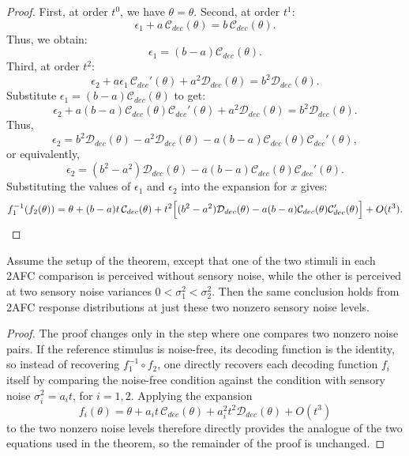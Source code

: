 \documentclass[si.tex]{subfiles}
\begin{document}
\begin{proof}
First, at order \( t^0 \), we have $\theta=\theta$.
Second, at order \( t^1 \):
\[
\epsilon_1 + a\,\mathcal{C}_{dec}(\theta) = b\,\mathcal{C}_{dec}(\theta).
\]
Thus, we obtain:
\[
\epsilon_1 = (b - a)\mathcal{C}_{dec}(\theta).
\]
Third, at order \( t^2 \):
\[
\epsilon_2 + a\epsilon_1\,\mathcal{C}_{dec}'(\theta) + a^2\mathcal{D}_{dec}(\theta) = b^2\mathcal{D}_{dec}(\theta).
\]
Substitute \(\epsilon_1 = (b-a)\mathcal{C}_{dec}(\theta)\) to get:
\[
\epsilon_2 + a(b-a)\mathcal{C}_{dec}(\theta)\mathcal{C}_{dec}'(\theta) + a^2\mathcal{D}_{dec}(\theta) = b^2\mathcal{D}_{dec}(\theta).
\]
Thus,
\[
\epsilon_2 = b^2\mathcal{D}_{dec}(\theta) - a^2\mathcal{D}_{dec}(\theta) - a(b-a)\mathcal{C}_{dec}(\theta)\mathcal{C}_{dec}'(\theta),
\]
or equivalently,
\[
\epsilon_2 = (b^2-a^2)\mathcal{D}_{dec}(\theta) - a(b-a)\mathcal{C}_{dec}(\theta)\mathcal{C}_{dec}'(\theta).
\]
Substituting the values of \(\epsilon_1\) and \(\epsilon_2\) into the expansion for \( x \) gives:
\[
f_1^{-1}(f_2(\theta)) = \theta + (b-a)t\,\mathcal{C}_{dec}(\theta) + t^2\Bigl[(b^2-a^2)\mathcal{D}_{dec}(\theta)-a(b-a)\mathcal{C}_{dec}(\theta)\mathcal{C}_{dec}'(\theta)\Bigr] + O(t^3).
\]
    \end{proof}

\begin{corollary}\label{cor:2afc-two-levels}
Assume the setup of the theorem, except that one of the two stimuli in each 2AFC comparison is perceived without sensory noise, while the other is perceived at two sensory noise variances \(0 < \sigma_1^2 < \sigma_2^2\).
Then the same conclusion holds from 2AFC response distributions at just these two nonzero sensory noise levels.
\end{corollary}

\begin{proof}
The proof changes only in the step where one compares two nonzero noise pairs.
If the reference stimulus is noise-free, its decoding function is the identity, so instead of recovering \(f_1^{-1}\circ f_2\), one directly recovers each decoding function \(f_i\) itself by comparing the noise-free condition against the condition with sensory noise \(\sigma_i^2 = a_i t\), for \(i=1,2\).
Applying the expansion
\[
f_i(\theta) = \theta + a_it\,\mathcal{C}_{dec}(\theta) + a_i^2 t^2 \mathcal{D}_{dec}(\theta) + O(t^3)
\]
to the two nonzero noise levels therefore directly provides the analogue of the two equations used in the theorem, so the remainder of the proof is unchanged.
\end{proof}
\end{document}
